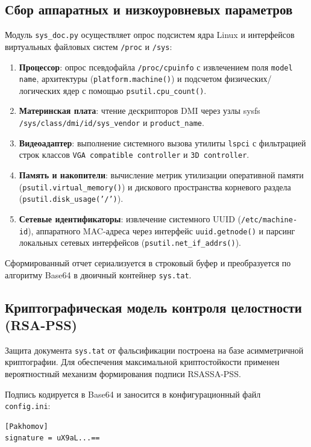 \documentclass[a4paper]{article}
\begin{document}
\subsection{Сбор аппаратных и низкоуровневых параметров}
Модуль \texttt{sys\_doc.py} осуществляет опрос подсистем ядра Linux и интерфейсов виртуальных файловых систем \texttt{/proc} и \texttt{/sys}:
\begin{enumerate}
    \item \textbf{Процессор}: опрос псевдофайла \texttt{/proc/cpuinfo} с извлечением поля \texttt{model name}, архитектуры (\texttt{platform.machine()}) и подсчетом физических/логических ядер с помощью \texttt{psutil.cpu\_count()}.
    \item \textbf{Материнская плата}: чтение дескрипторов DMI через узлы sysfs \\ \texttt{/sys/class/dmi/id/sys\_vendor} и \texttt{product\_name}.
    \item \textbf{Видеоадаптер}: выполнение системного вызова утилиты \texttt{lspci} с фильтрацией строк классов \texttt{VGA compatible controller} и \texttt{3D controller}.
    \item \textbf{Память и накопители}: вычисление метрик утилизации оперативной памяти \\ (\texttt{psutil.virtual\_memory()}) и дискового пространства корневого раздела \\ (\texttt{psutil.disk\_usage('/')}).
    \item \textbf{Сетевые идентификаторы}: извлечение системного UUID (\texttt{/etc/machine-id}), аппаратного MAC-адреса через интерфейс \texttt{uuid.getnode()} и парсинг локальных сетевых интерфейсов (\texttt{psutil.net\_if\_addrs()}).
\end{enumerate}

Сформированный отчет сериализуется в строковый буфер и преобразуется по алгоритму Base64 в двоичный контейнер \texttt{sys.tat}.

\subsection{Криптографическая модель контроля целостности (RSA-PSS)}
Защита документа \texttt{sys.tat} от фальсификации построена на базе асимметричной криптографии. Для обеспечения максимальной криптостойкости применен вероятностный механизм формирования подписи RSASSA-PSS.

Подпись кодируется в Base64 и заносится в конфигурационный файл \texttt{config.ini}:
\begin{lstlisting}
[Pakhomov]
signature = uX9aL...==
\end{lstlisting}
\end{document}
